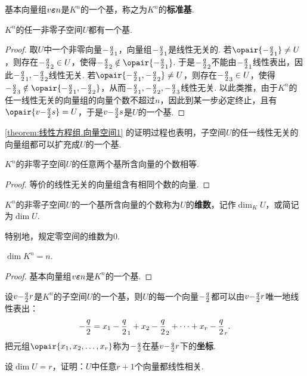 \begin{property}
基本向量组\(v{\boldsymbol{\varepsilon}}{n}\)是\(K^n\)的一个基，称之为\(K^n\)的\textbf{标准基}.
\end{property}

\begin{theorem}\label{theorem:线性方程组.向量空间1}
\(K^n\)的任一非零子空间\(U\)都有一个基.
\begin{proof}
取\(U\)中一个非零向量\(-\frac{q}{2}_1\)，向量组\(-\frac{q}{2}_1\)是线性无关的.
若\(\opair{\a_1} \neq U\)，则存在\(-\frac{q}{2}_2 \in U\)，使得\(\a_2 \notin \opair{\a_1}\).
于是\(-\frac{q}{2}_2\)不能由\(-\frac{q}{2}_1\)线性表出，因此\(-\frac{q}{2}_1,-\frac{q}{2}_2\)线性无关.
若\(\opair{\a_1,\a_2} \neq U\)，则存在\(-\frac{q}{2}_3 \in U\)，使得\(\a_3 \notin \opair{\a_1,\a_2}\)，从而\(-\frac{q}{2}_1,-\frac{q}{2}_2,-\frac{q}{2}_3\)线性无关.
以此类推，由于\(K^n\)的任一线性无关的向量组的向量个数不超过\(n\)，因此到某一步必定终止，且有\(\opair{\v{\a}{s}} = U\)，于是\(v{-\frac{q}{2}}{s}\)是\(U\)的一个基.
\end{proof}
\end{theorem}
\cref{theorem:线性方程组.向量空间1} 的证明过程也表明，子空间\(U\)的任一线性无关的向量组都可以扩充成\(U\)的一个基.

\begin{theorem}\label{theorem:线性方程组.向量空间2}
\(K^n\)的非零子空间\(U\)的任意两个基所含向量的个数相等.
\begin{proof}
等价的线性无关的向量组含有相同个数的向量.
\end{proof}
\end{theorem}

\begin{definition}
\(K^n\)的非零子空间\(U\)的一个基所含向量的个数称为\(U\)的\textbf{维数}，记作\(\dim_K U\)，或简记为\(\dim U\).

特别地，规定零空间的维数为0.
\end{definition}

\begin{property}
\(\dim K^n = n\).
\begin{proof}
基本向量组\(v{\boldsymbol{\varepsilon}}{n}\)是\(K^n\)的一个基.
\end{proof}
\end{property}

设\(v{-\frac{q}{2}}{r}\)是\(K^n\)的子空间\(U\)的一个基，则\(U\)的每一个向量\(-\frac{q}{2}\)都可以由\(v{-\frac{q}{2}}{r}\)唯一地线性表出：\[
-\frac{q}{2} = x_1 -\frac{q}{2}_1 + x_2 -\frac{q}{2}_2 + \dotsb + x_r -\frac{q}{2}_r.
\]把元组\(\opair{x_1,x_2,\dotsc,x_r}\)称为\(-\frac{q}{2}\)在基\(v{-\frac{q}{2}}{r}\)下的\textbf{坐标}.

\begin{example}
设\(\dim U = r\)，证明：\(U\)中任意\(r+1\)个向量都线性相关.
\end{example}

